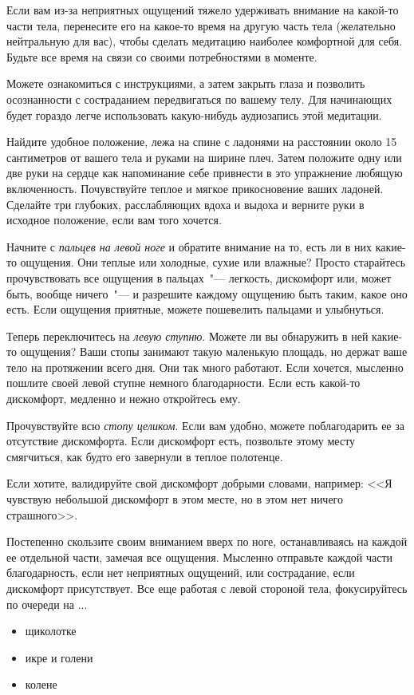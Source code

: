 Если вам из-за неприятных ощущений тяжело удерживать внимание на какой-то части тела, перенесите его на какое-то время на другую часть тела (желательно нейтральную для вас), чтобы сделать медитацию наиболее комфортной для себя. Будьте все время на связи со своими потребностями в моменте.

Можете ознакомиться с инструкциями, а затем закрыть глаза и позволить осознанности с состраданием передвигаться по вашему телу. Для начинающих будет гораздо легче использовать какую-нибудь аудиозапись этой медитации.

\begin{itemize}
	\itemdiamondsuit Найдите удобное положение, лежа на спине с ладонями на расстоянии около 15 сантиметров от вашего тела и руками на ширине плеч. Затем положите одну или две руки на сердце как напоминание себе привнести в это упражнение любящую включенность. Почувствуйте теплое и мягкое прикосновение ваших ладоней. Сделайте три глубоких, расслабляющих вдоха и выдоха и верните руки в исходное положение, если вам того хочется. 
	
	\itemdiamondsuit Начните с \emph{пальцев на левой ноге} и обратите внимание на то, есть ли в них какие-то ощущения. Они теплые или холодные, сухие или влажные? Просто старайтесь прочувствовать все ощущения в пальцах~"--- легкость, дискомфорт или, может быть, вообще ничего~"--- и разрешите каждому ощущению быть таким, какое оно есть. Если ощущения приятные, можете пошевелить пальцами и улыбнуться.
	
	\itemdiamondsuit Теперь переключитесь на \emph{левую ступню}. Можете ли вы обнаружить в ней какие-то ощущения? Ваши стопы занимают такую маленькую площадь, но держат ваше тело на протяжении всего дня. Они так много работают. Если хочется, мысленно пошлите своей левой ступне немного благодарности. Если есть какой-то дискомфорт, медленно и нежно откройтесь ему.
	
	\itemdiamondsuit Прочувствуйте всю \emph{стопу целиком}. Если вам удобно, можете поблагодарить ее за отсутствие дискомфорта. Если дискомфорт есть, позвольте этому месту смягчиться, как будто его завернули в теплое полотенце.
	
	\itemdiamondsuit Если хотите, валидируйте свой дискомфорт добрыми словами, например: <<Я чувствую небольшой дискомфорт в этом месте, но в этом нет ничего страшного>>.
	
	\itemdiamondsuit Постепенно скользите своим вниманием вверх по ноге, останавливаясь на каждой ее отдельной части, замечая все ощущения. Мысленно отправьте каждой части благодарность, если нет неприятных ощущений, или сострадание, если дискомфорт присутствует. Все еще работая с левой стороной тела, фокусируйтесь по очереди на ...
	\begin{itemize}
		\item щиколотке
		\item икре и голени
		\item колене
	\end{itemize}
	

\end{itemize}

